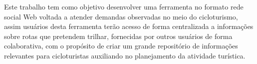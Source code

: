 Este trabalho tem como objetivo desenvolver uma ferramenta no formato rede social Web voltada a atender demandas observadas no meio do cicloturismo,
assim usuários desta ferramenta terão acesso de forma centralizada a informações sobre rotas que pretendem trilhar, fornecidas por outros usuários
de forma colaborativa, com o propósito de criar um grande repositório de informações relevantes para cicloturistas auxiliando no planejamento da 
atividade turística.
